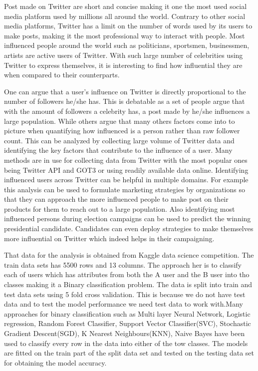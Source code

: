 \documentclass[sigconf]{acmart}
\begin{document}
Post made on Twitter are short and concise making it one the most used social media platform used by millions all around the world. Contrary to other social media platforms, Twitter has a limit on the number of words used by its users to make posts, making it the most professional way to interact with people. Most influenced people around the world such as politicians, sportsmen, businessmen, artists are active users of Twitter. With such large number of celebrities using Twitter to express themselves, it is interesting to find how influential they are when compared to their counterparts.

One can argue that a user's influence on Twitter is directly proportional to the number of followers he/she has. This is debatable as a set of people argue that with the amount of followers a celebrity has, a post made by he/she influences a large population. While others argue that many others factors come into to picture when quantifying how influenced is a person rather than raw follower count. This can be analyzed by collecting large volume of Twitter data and identifying the key factors that contribute to the influence of a user. Many methods are in use for collecting data from Twitter with the most popular ones being Twitter API and GOT3 or using readily available data online. Identifying influenced users across Twitter can be helpful in multiple domains. For example this analysis can be used to formulate marketing strategies by organizations so that they can approach the more influenced people to make post on their products for them to reach out to a large population. Also identifying most influenced persons during election campaigns can be used to predict the winning presidential candidate. Candidates can even deploy strategies to make themselves more influential on Twitter which indeed helps in their campaigning.

That data for the analysis is obtained from Kaggle data science competition. The train data sets has 5500 rows and 13 columns. The approach her is to classify each of users which has attributes from both the A user and the B user into tho classes making it a Binary classification problem. The data is split into train and test data sets using 5 fold cross validation. This is because we do not have test data and to test the model performance we need test data to work with.Many approaches for binary classification such as Multi layer Neural Network, Logistic regression, Random Forest Classifier, Support Vector Classifier(SVC), Stochastic Gradient Descent(SGD), K Nearest Neighbours(KNN), Naive Bayes have been used to classify every row in the data into either of the tow classes. The models are fitted on the train part of the split data set and tested on the testing data set for obtaining the model accuracy.
\end{document}
